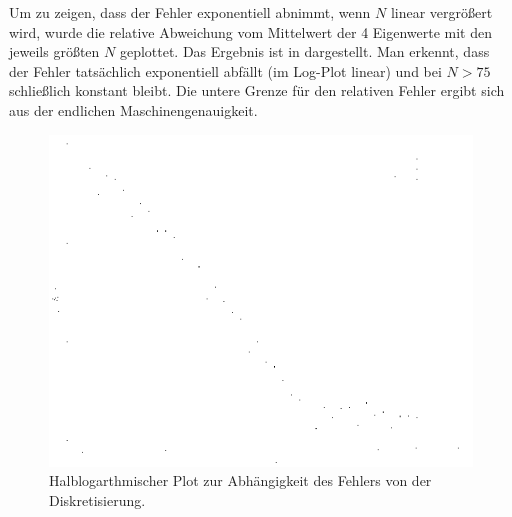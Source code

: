 Um zu zeigen, dass der Fehler exponentiell abnimmt, wenn $N$ linear vergrößert
wird, wurde die relative Abweichung vom Mittelwert der 4 Eigenwerte mit den jeweils
größten $N$ geplottet. Das Ergebnis ist in  dargestellt. Man erkennt,
dass der Fehler tatsächlich exponentiell abfällt (im Log-Plot linear) und bei
 $N > 75$ schließlich konstant bleibt. Die untere Grenze für den relativen Fehler
ergibt sich aus der endlichen Maschinengenauigkeit.

\begin{figure}[htb]
  \centering
  \includegraphics[width=0.8\columnwidth,keepaspectratio]{../tmp/plot62b.png}
  \caption{Halblogarthmischer Plot zur Abhängigkeit des Fehlers von der Diskretisierung.}
  \label{fig:62b}
\end{figure}